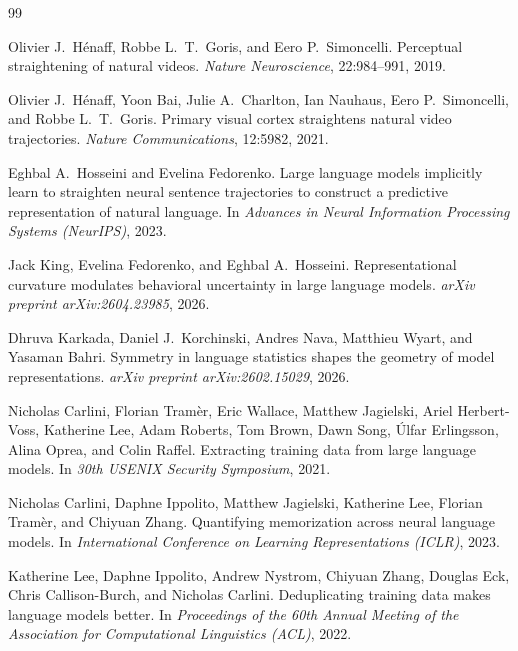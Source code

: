 \documentclass[11pt,letterpaper]{article}
\begin{document}
\begin{thebibliography}{99}

Olivier J.\ H{\'e}naff, Robbe L.\ T.\ Goris, and Eero P.\ Simoncelli.
\newblock Perceptual straightening of natural videos.
\newblock \emph{Nature Neuroscience}, 22:984--991, 2019.

Olivier J.\ H{\'e}naff, Yoon Bai, Julie A.\ Charlton, Ian Nauhaus, Eero P.\ Simoncelli, and Robbe L.\ T.\ Goris.
\newblock Primary visual cortex straightens natural video trajectories.
\newblock \emph{Nature Communications}, 12:5982, 2021.

Eghbal A.\ Hosseini and Evelina Fedorenko.
\newblock Large language models implicitly learn to straighten neural sentence trajectories to construct a predictive representation of natural language.
\newblock In \emph{Advances in Neural Information Processing Systems (NeurIPS)}, 2023.

Jack King, Evelina Fedorenko, and Eghbal A.\ Hosseini.
\newblock Representational curvature modulates behavioral uncertainty in large language models.
\newblock \emph{arXiv preprint arXiv:2604.23985}, 2026.

Dhruva Karkada, Daniel J.\ Korchinski, Andres Nava, Matthieu Wyart, and Yasaman Bahri.
\newblock Symmetry in language statistics shapes the geometry of model representations.
\newblock \emph{arXiv preprint arXiv:2602.15029}, 2026.

Nicholas Carlini, Florian Tram{\`e}r, Eric Wallace, Matthew Jagielski, Ariel Herbert-Voss, Katherine Lee, Adam Roberts, Tom Brown, Dawn Song, {\'U}lfar Erlingsson, Alina Oprea, and Colin Raffel.
\newblock Extracting training data from large language models.
\newblock In \emph{30th USENIX Security Symposium}, 2021.

Nicholas Carlini, Daphne Ippolito, Matthew Jagielski, Katherine Lee, Florian Tram{\`e}r, and Chiyuan Zhang.
\newblock Quantifying memorization across neural language models.
\newblock In \emph{International Conference on Learning Representations (ICLR)}, 2023.

Katherine Lee, Daphne Ippolito, Andrew Nystrom, Chiyuan Zhang, Douglas Eck, Chris Callison-Burch, and Nicholas Carlini.
\newblock Deduplicating training data makes language models better.
\newblock In \emph{Proceedings of the 60th Annual Meeting of the Association for Computational Linguistics (ACL)}, 2022.


\end{thebibliography}
\end{document}
